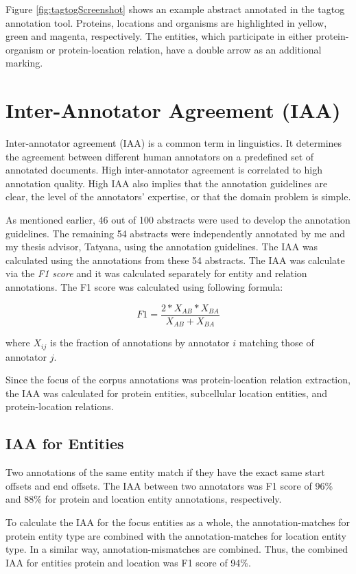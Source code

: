Figure \ref{fig:tagtogScreenshot} shows an example abstract annotated in the tagtog annotation tool. Proteins, locations and organisms are highlighted in yellow, green and magenta, respectively. The entities, which participate in either protein-organism or protein-location relation, have a double arrow as an additional marking.

\section{Inter-Annotator Agreement (IAA)}

Inter-annotator agreement (IAA) is a common term in linguistics. It determines the agreement between different human annotators on a predefined set of annotated documents. High inter-annotator agreement is correlated to high annotation quality. High IAA also implies that the annotation guidelines are clear, the level of the annotators' expertise, or that the domain problem is simple.

As mentioned earlier, 46 out of 100 abstracts were used to develop the annotation guidelines. The remaining 54 abstracts were independently annotated by me and my thesis advisor, Tatyana, using the annotation guidelines. The IAA was calculated using the annotations from these 54 abstracts. The IAA was calculate via the \textit{F1 score} and it was calculated separately for entity and relation annotations. The F1 score was calculated using following formula:

$$
F1 = \frac{2*X_{AB}*X_{BA}}{X_{AB}+X_{BA}}
$$

where $X_{ij}$ is the fraction of annotations by annotator $i$ matching those of annotator $j$.

Since the focus of the corpus annotations was protein-location relation extraction, the IAA was calculated for protein entities, subcellular location entities, and protein-location relations.

\subsection*{IAA for Entities}

Two annotations of the same entity match if they have the exact same start offsets and end offsets. The IAA between two annotators was F1 score of 96\% and 88\% for protein and location entity annotations, respectively. 

To calculate the IAA for the focus entities as a whole, the annotation-matches for protein entity type are combined with the annotation-matches for location entity type. In a similar way, annotation-mismatches are combined. Thus, the combined IAA for entities protein and location was F1 score of 94\%.

